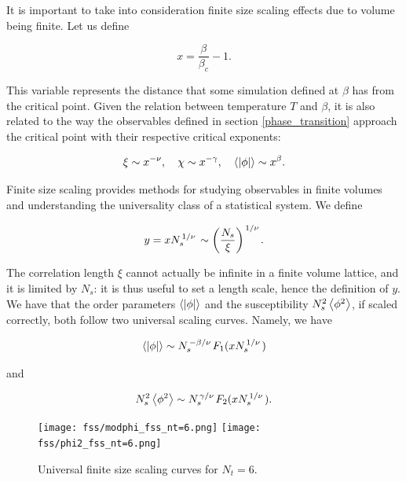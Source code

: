 \documentclass[reqno,12pt]{article}
\numberwithin{equation}{section}
\begin{document}
It is important to take into consideration finite size scaling effects due to volume being finite.
Let us define

\begin{equation}
	x = \frac{\beta}{\beta_c} - 1.
\end{equation}

This variable represents the distance that some simulation defined at $\beta$ has from the critical point. Given
the relation between temperature $T$ and $\beta$, it is also related to the way the observables
defined in section \ref{phase_transition} approach the critical point with their respective critical exponents:

\begin{equation}
	\xi \sim x^{-\nu} \qc \chi \sim x^{-\gamma} \qc \expval{|\phi|} \sim x^{\beta}.
\end{equation}

Finite size scaling provides methods for studying observables in finite volumes and understanding the 
universality class of a statistical system. We define

\begin{equation}
	y = x N_s^{\flatfrac{1}{\nu}} \sim \qty(\frac{N_s}{\xi})^{\flatfrac{1}{\nu}}.
\end{equation}

The correlation length $\xi$ cannot actually be infinite in a finite volume lattice, and it is limited by $N_s$: 
it is thus useful to set a length scale, hence the definition of $y$. We have that the order parameters
$\expval{|\phi|}$ and the susceptibility $N_s^2 \expval{\phi^2}$, if scaled correctly, both follow
two universal scaling curves. Namely, we have

\begin{equation}
	\expval{|\phi|} \sim N_s^{\flatfrac{-\beta}{\nu}} F_1(x N_s^{\flatfrac{1}{\nu}})
\end{equation}

and 

\begin{equation}
	N_s^2 \expval{\phi^2} \sim N_s^{\flatfrac{\gamma}{\nu}} F_2(x N_s^{\flatfrac{1}{\nu}}).
\end{equation}

\begin{figure}[h]
	\centering
	\texttt{[image: fss/modphi\_fss\_nt=6.png]}
	\texttt{[image: fss/phi2\_fss\_nt=6.png]}
	\caption[Finite size scaling curve for $N_t = 6$]{Universal finite size scaling curves for $N_t = 6$.}
\label{fig:fss}
\end{figure}
\end{document}

